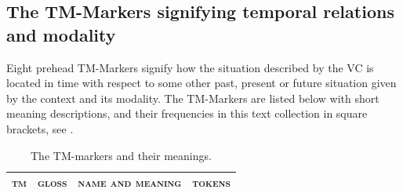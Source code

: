 \documentclass[output=paper]{langscibook}
\begin{document}
\subsection{The TM-Markers signifying temporal relations and modality}\label{sec:tmmarker}
Eight prehead TM-Markers signify how the situation described by the VC is located in time with respect to some other past, present or future situation given by the context and its modality. The TM-Markers are listed below with short meaning descriptions, and their frequencies in this text collection in square brackets, see .

\begin{table}[b]
    \caption{The TM-markers and their meanings.} \label{tab:tmmarkers}
\begin{tabularx}{\textwidth}{llQl}
    \lsptoprule
    \textsc{tm}&\textsc{gloss}&\textsc{name and meaning}&\textsc{tokens}\\
    \midrule
    

\end{tabularx}
\end{table}
\end{document}
